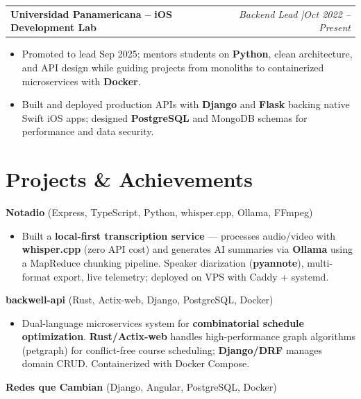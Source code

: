 \documentclass[10pt, letterpaper]{article}
\makeatletter
\newcommand{\entry}[2]{%
  \noindent\begin{tabular*}{\textwidth}{@{}l@{\extracolsep{\fill}}r@{}}
    #1 & #2
  \end{tabular*}}
\newenvironment{cvlist}{%
  \begin{itemize}[leftmargin=1.2em,itemsep=0.5pt,topsep=2pt,parsep=0pt]
}{\end{itemize}}
\makeatother
\begin{document}
\entry{\textbf{Universidad Panamericana -- iOS Development Lab}}{%
  \textit{Backend Lead \enspace|\enspace Oct 2022 -- Present}}

\begin{cvlist}
  \item Promoted to lead Sep 2025; mentors students on \textbf{Python}, clean
        architecture, and API design while guiding projects from monoliths to
        containerized microservices with \textbf{Docker}.
  \item Built and deployed production APIs with \textbf{Django} and \textbf{Flask}
        backing native Swift iOS apps; designed \textbf{PostgreSQL} and MongoDB schemas
        for performance and data security.
\end{cvlist}

\section{Projects \& Achievements}

\noindent\textbf{Notadio} (Express, TypeScript, Python, whisper.cpp, Ollama, FFmpeg)

\begin{cvlist}
  \item Built a \textbf{local-first transcription service} --- processes audio/video
        with \textbf{whisper.cpp} (zero API cost) and generates AI summaries via
        \textbf{Ollama} using a MapReduce chunking pipeline. Speaker diarization
        (\textbf{pyannote}), multi-format export, live telemetry; deployed on VPS
        with Caddy + systemd.
\end{cvlist}

\smallskip

\noindent\textbf{backwell-api} (Rust, Actix-web, Django, PostgreSQL, Docker)

\begin{cvlist}
  \item Dual-language microservices system for \textbf{combinatorial schedule
        optimization}. \textbf{Rust/Actix-web} handles high-performance graph
        algorithms (petgraph) for conflict-free course scheduling; \textbf{Django/DRF}
        manages domain CRUD. Containerized with Docker Compose.
\end{cvlist}

\smallskip

\noindent\textbf{Redes que Cambian} (Django, Angular, PostgreSQL, Docker)
\end{document}
